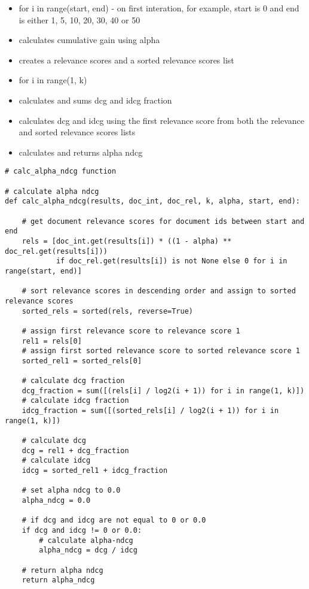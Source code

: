 \documentclass{article} %
\begin{document}
\begin{itemize}
    \item for i in range(start, end) - on first interation, for example, start is 0 and end is either 1, 5, 10, 20, 30, 40 or 50
    \item calculates cumulative gain using alpha
    \item creates a relevance scores and a sorted relevance scores list
    \item for i in range(1, k)
    \item calculates and sums dcg and idcg fraction
    \item calculates dcg and idcg using the first relevance score from both the relevance and sorted relevance scores lists
    \item calculates and returns alpha ndcg
\end{itemize}

\begin{lstlisting}[style=Python]
# calc_alpha_ndcg function

# calculate alpha ndcg
def calc_alpha_ndcg(results, doc_int, doc_rel, k, alpha, start, end):

    # get document relevance scores for document ids between start and end
    rels = [doc_int.get(results[i]) * ((1 - alpha) ** doc_rel.get(results[i]))
            if doc_rel.get(results[i]) is not None else 0 for i in range(start, end)]

    # sort relevance scores in descending order and assign to sorted relevance scores
    sorted_rels = sorted(rels, reverse=True)

    # assign first relevance score to relevance score 1
    rel1 = rels[0]
    # assign first sorted relevance score to sorted relevance score 1
    sorted_rel1 = sorted_rels[0]

    # calculate dcg fraction
    dcg_fraction = sum([(rels[i] / log2(i + 1)) for i in range(1, k)])
    # calculate idcg fraction
    idcg_fraction = sum([(sorted_rels[i] / log2(i + 1)) for i in range(1, k)])

    # calculate dcg
    dcg = rel1 + dcg_fraction
    # calculate idcg
    idcg = sorted_rel1 + idcg_fraction

    # set alpha ndcg to 0.0
    alpha_ndcg = 0.0

    # if dcg and idcg are not equal to 0 or 0.0
    if dcg and idcg != 0 or 0.0:
        # calculate alpha-ndcg
        alpha_ndcg = dcg / idcg

    # return alpha ndcg
    return alpha_ndcg
\end{lstlisting}
\end{document}
